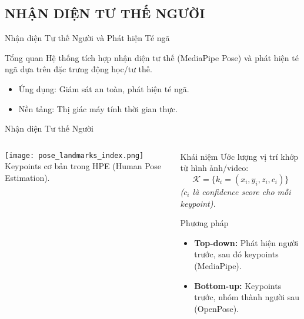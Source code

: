 \subsection{NHẬN DIỆN TƯ THẾ NGƯỜI}
\begin{frame}{Nhận diện Tư thế Người và Phát hiện Té ngã}
    \begin{block}{Tổng quan}
        Hệ thống tích hợp nhận diện tư thế (MediaPipe Pose) và phát hiện té ngã dựa trên đặc trưng động học/tư thế.
        \begin{itemize}
            \item Ứng dụng: Giám sát an toàn, phát hiện té ngã.
            \item Nền tảng: Thị giác máy tính thời gian thực.
        \end{itemize}
    \end{block}
\end{frame}

\begin{frame}{Nhận diện Tư thế Người}
\begin{columns}[T]
    \begin{column}{0.45\textwidth}
        \centering
        \texttt{[image: pose\_landmarks\_index.png]}
        \vspace{0.2cm}
        {\small Keypoints cơ bản trong HPE (Human Pose Estimation).}
    \end{column}

    \begin{column}{0.55\textwidth}
        \begin{block}{Khái niệm}
            Ước lượng vị trí khớp từ hình ảnh/video:
            \[
                \mathcal{K} = \{k_i = (x_i, y_i, z_i, c_i)\}
            \]
            \small{\textit{($c_i$ là confidence score cho mỗi keypoint).}}
        \end{block}

        \begin{alertblock}{Phương pháp}
            \begin{itemize}
                \item \textbf{Top-down:} Phát hiện người trước, sau đó keypoints (MediaPipe).
                \item \textbf{Bottom-up:} Keypoints trước, nhóm thành người sau (OpenPose).
            \end{itemize}
        \end{alertblock}
    \end{column}
\end{columns}
\end{frame}

